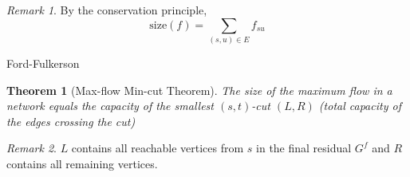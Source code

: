 \documentclass[11pt]{article}
\newtheorem{theorem}{Theorem}[section]
\theoremstyle{definition}
\theoremstyle{remark}
\newtheorem*{remark}{Remark}
\begin{document}
\begin{remark} By the conservation principle,
\[\text{size}(f) = \sum_{(s,u)\in E} f_{su}\]
\end{remark}

\begin{algorithm}[ht]
    \caption{Ford-Fulkerson}
    \DontPrintSemicolon
    
    
\end{algorithm}

\begin{theorem}[Max-flow Min-cut Theorem]
The size of the maximum flow in a network equals the capacity
of the smallest $(s,t)$-cut $(L,R)$ (total capacity of the edges crossing the cut)
\end{theorem}

\begin{remark}
$L$ contains all reachable vertices from $s$ in the final residual $G^f$ and $R$ contains all remaining vertices.
\end{remark}
\end{document}
